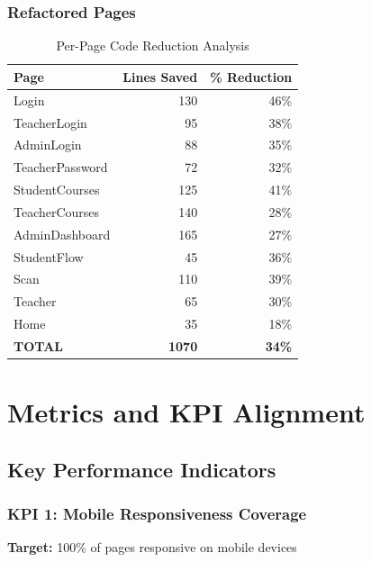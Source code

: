 \documentclass[11pt, a4paper]{report}
\begin{document}
\subsection{Refactored Pages}

\begin{table}[H]
    \centering
    \caption{Per-Page Code Reduction Analysis}
    \begin{tabular}{|l|r|r|}
        \hline
        \textbf{Page} & \textbf{Lines Saved} & \textbf{\% Reduction} \\
        \hline
        Login & 130 & 46\% \\
        TeacherLogin & 95 & 38\% \\
        AdminLogin & 88 & 35\% \\
        TeacherPassword & 72 & 32\% \\
        StudentCourses & 125 & 41\% \\
        TeacherCourses & 140 & 28\% \\
        AdminDashboard & 165 & 27\% \\
        StudentFlow & 45 & 36\% \\
        Scan & 110 & 39\% \\
        Teacher & 65 & 30\% \\
        Home & 35 & 18\% \\
        \hline
        \textbf{TOTAL} & \textbf{1070} & \textbf{34\%} \\
        \hline
    \end{tabular}
\end{table}

\chapter{Metrics and KPI Alignment}

\section{Key Performance Indicators}

\subsection{KPI 1: Mobile Responsiveness Coverage}

\textbf{Target:} 100\% of pages responsive on mobile devices
\end{document}
